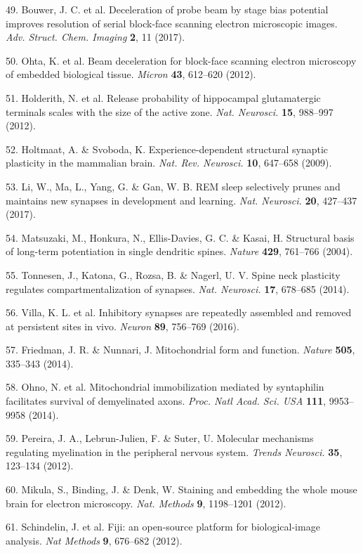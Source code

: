 \documentclass{article}
\begin{document}
\begin{hangpars}
49. Bouwer, J. C. et al. Deceleration of probe beam by stage bias potential improves resolution of serial block-face scanning electron microscopic images. \emph{Adv. Struct. Chem. Imaging} \textbf{2}, 11 (2017).

50. Ohta, K. et al. Beam deceleration for block-face scanning electron microscopy of embedded biological tissue. \emph{Micron} \textbf{43}, 612–620 (2012).

51. Holderith, N. et al. Release probability of hippocampal glutamatergic terminals scales with the size of the active zone. \emph{Nat. Neurosci.} \textbf{15}, 988–997 (2012).

52. Holtmaat, A. \& Svoboda, K. Experience-dependent structural synaptic plasticity in the mammalian brain. \emph{Nat. Rev. Neurosci.} \textbf{10}, 647–658 (2009).

53. Li, W., Ma, L., Yang, G. \& Gan, W. B. REM sleep selectively prunes and maintains new synapses in development and learning. \emph{Nat. Neurosci.} \textbf{20}, 427–437 (2017).

54. Matsuzaki, M., Honkura, N., Ellis-Davies, G. C. \& Kasai, H. Structural basis of long-term potentiation in single dendritic spines. \emph{Nature} \textbf{429}, 761–766 (2004).

55. Tonnesen, J., Katona, G., Rozsa, B. \& Nagerl, U. V. Spine neck plasticity regulates compartmentalization of synapses. \emph{Nat. Neurosci.} \textbf{17}, 678–685 (2014).

56. Villa, K. L. et al. Inhibitory synapses are repeatedly assembled and removed at persistent sites in vivo. \emph{Neuron} \textbf{89}, 756–769 (2016).

57. Friedman, J. R. \& Nunnari, J. Mitochondrial form and function. \emph{Nature} \textbf{505}, 335–343 (2014).

58. Ohno, N. et al. Mitochondrial immobilization mediated by syntaphilin facilitates survival of demyelinated axons. \emph{Proc. Natl Acad. Sci. USA} \textbf{111}, 9953–9958 (2014).

59. Pereira, J. A., Lebrun-Julien, F. \& Suter, U. Molecular mechanisms regulating myelination in the peripheral nervous system. \emph{Trends Neurosci.} \textbf{35}, 123–134 (2012).

60. Mikula, S., Binding, J. \& Denk, W. Staining and embedding the whole mouse brain for electron microscopy. \emph{Nat. Methods} \textbf{9}, 1198–1201 (2012).

61. Schindelin, J. et al. Fiji: an open-source platform for biological-image analysis. \emph{Nat Methods} \textbf{9}, 676–682 (2012).


\end{hangpars}
\end{document}
